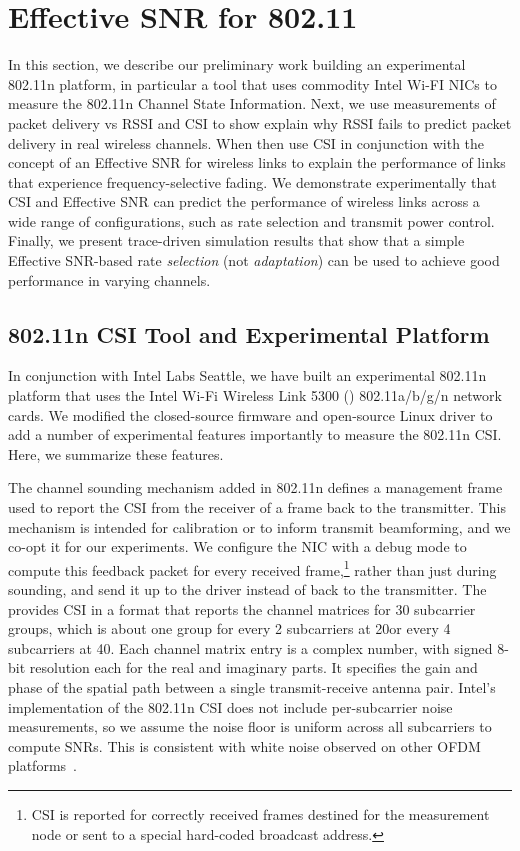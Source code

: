 \chapter{Effective SNR for 802.11}
\label{chap:esnr_intro}

In this section, we describe our preliminary work building an experimental 802.11n platform, in particular a tool that uses commodity Intel Wi-FI NICs to measure the 802.11n Channel State Information. Next, we use measurements of packet delivery vs RSSI and CSI to show explain why RSSI fails to predict packet delivery in real wireless channels. When then use CSI in conjunction with the concept of an Effective SNR for wireless links to explain the performance of links that experience frequency-selective fading. We demonstrate experimentally that CSI and Effective SNR can predict the performance of wireless links across a wide range of configurations, such as rate selection and transmit power control. Finally, we present trace-driven simulation results that show that a simple Effective SNR-based rate \emph{selection} (not \emph{adaptation}) can be used to achieve good performance in varying channels.

\section{802.11n CSI Tool and Experimental Platform}
\label{sec:platform}
In conjunction with Intel Labs Seattle, we have built an experimental 802.11n platform that uses the Intel Wi-Fi Wireless Link 5300 () 802.11a/b/g/n network cards. We modified the closed-source firmware and open-source Linux driver to add a number of experimental features importantly to measure the 802.11n CSI\@. Here, we summarize these features.

 The channel sounding mechanism added in 802.11n defines a management frame used to report the CSI from the receiver of a frame back to the transmitter. This mechanism is intended for calibration or to inform transmit beamforming, and we co-opt it for our experiments. We configure the NIC with a debug mode to compute this feedback packet for every received frame,\footnote{CSI is reported for correctly received frames destined for the measurement node or sent to a special hard-coded broadcast address.} rather than just during sounding, and send it up to the driver instead of back to the transmitter. The  provides CSI in a format that reports the channel matrices for 30 subcarrier groups, which is about one group for every 2 subcarriers at 20\MHz or every 4 subcarriers at 40\MHz. Each channel matrix entry is a complex number, with signed 8-bit resolution each for the real and imaginary parts. It specifies the gain and phase of the spatial path between a single transmit-receive antenna pair. Intel's implementation of the 802.11n CSI does not include per-subcarrier noise measurements, so we assume the noise floor is uniform across all subcarriers to compute SNRs. This is consistent with white noise observed on other OFDM platforms~\cite{Rahul_FARA}.

